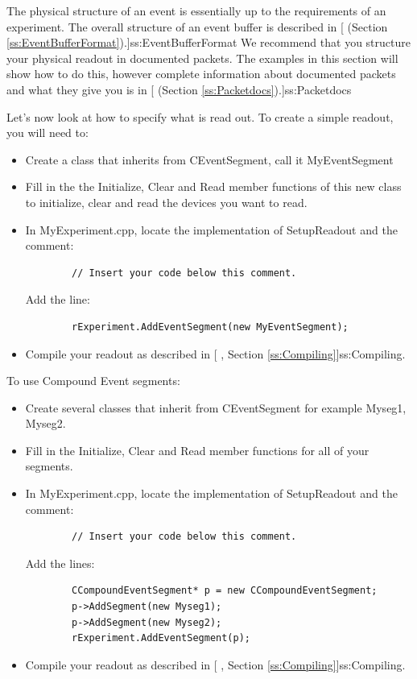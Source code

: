    The physical structure of an event is essentially up to the
   requirements of an experiment.  The overall structure of
   an event buffer is described in [
      (Section \ref{ss:EventBufferFormat}).]{ss:EventBufferFormat}
   We recommend that you structure your physical readout in 
   documented packets.  The examples in this section will show
   how to do this, however complete information about documented
   packets and what they give you is in 
   [ (Section
      \ref{ss:Packetdocs}).]{ss:Packetdocs}

   Let's now look at how to specify what is read out.  To
   create a simple readout, you will need to:
   \begin{itemize}
      \item Create a class that inherits from CEventSegment, call it
		MyEventSegment
      \item Fill in the the Initialize, Clear and Read member functions of
		this new class to initialize, clear and read the devices you
		want to read.
      \item In MyExperiment.cpp, locate the implementation of 
		SetupReadout and the comment:
		\begin{verbatim}
		// Insert your code below this comment.
		\end{verbatim}
		Add the line:
		\begin{verbatim}
		rExperiment.AddEventSegment(new MyEventSegment);
		\end{verbatim}
      \item Compile your readout as described in 
		[
		, Section \ref{ss:Compiling}]{ss:Compiling}.
   \end{itemize}


   To use Compound Event segments:
   \begin{itemize}
      \item Create several classes that inherit from CEventSegment
	 for example Myseg1, Myseg2.
      \item Fill in the Initialize, Clear and Read member
	 functions for all of your segments.
      \item In MyExperiment.cpp, locate the implementation of 
	    SetupReadout and the comment:
	    \begin{verbatim}
	    // Insert your code below this comment.
	    \end{verbatim}
	    Add the lines:
	    \begin{verbatim}
	    CCompoundEventSegment* p = new CCompoundEventSegment;
	    p->AddSegment(new Myseg1);
	    p->AddSegment(new Myseg2);
	    rExperiment.AddEventSegment(p);
	    \end{verbatim}
      \item Compile your readout as described in 
	    [
	    , Section \ref{ss:Compiling}]{ss:Compiling}.   
   \end{itemize}
   
